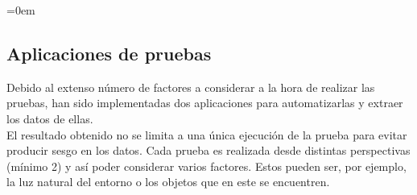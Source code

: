 \parindent=0em
\subsection{Aplicaciones de pruebas}
\noindent

Debido al extenso número de factores a considerar a la hora de realizar las pruebas, han sido implementadas dos aplicaciones para automatizarlas y extraer los datos de ellas.\\

El resultado obtenido no se limita a una única ejecución de la prueba para evitar producir sesgo en los datos. Cada prueba es realizada desde distintas perspectivas (mínimo 2) y así poder considerar varios factores. Estos pueden ser, por ejemplo, la luz natural del entorno o los objetos que en este se encuentren.\\ 

